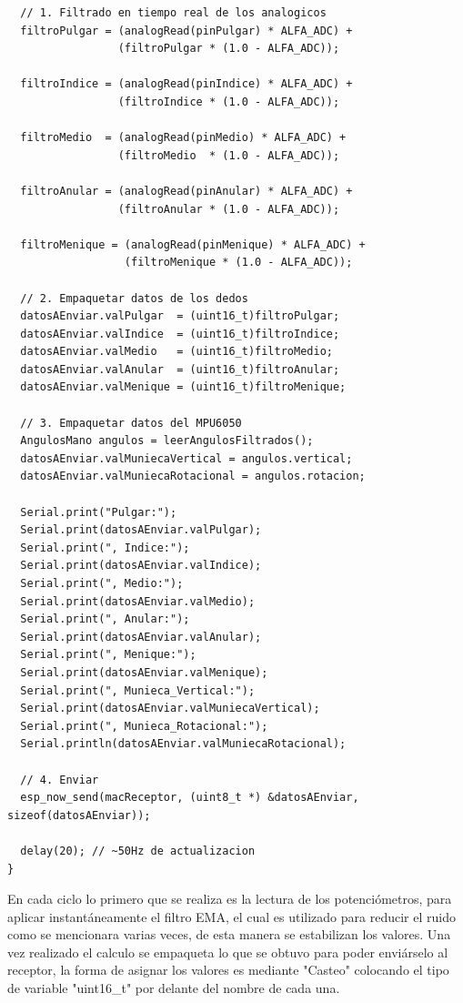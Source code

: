 \documentclass[10pt]{article}
\begin{document}
\begin{lstlisting}
  // 1. Filtrado en tiempo real de los analogicos
  filtroPulgar = (analogRead(pinPulgar) * ALFA_ADC) + 
                 (filtroPulgar * (1.0 - ALFA_ADC));
  
  filtroIndice = (analogRead(pinIndice) * ALFA_ADC) + 
                 (filtroIndice * (1.0 - ALFA_ADC));
  
  filtroMedio  = (analogRead(pinMedio) * ALFA_ADC) + 
                 (filtroMedio  * (1.0 - ALFA_ADC));
  
  filtroAnular = (analogRead(pinAnular) * ALFA_ADC) + 
                 (filtroAnular * (1.0 - ALFA_ADC));
  
  filtroMenique = (analogRead(pinMenique) * ALFA_ADC) + 
                  (filtroMenique * (1.0 - ALFA_ADC));

  // 2. Empaquetar datos de los dedos
  datosAEnviar.valPulgar  = (uint16_t)filtroPulgar;
  datosAEnviar.valIndice  = (uint16_t)filtroIndice;
  datosAEnviar.valMedio   = (uint16_t)filtroMedio;
  datosAEnviar.valAnular  = (uint16_t)filtroAnular;
  datosAEnviar.valMenique = (uint16_t)filtroMenique;

  // 3. Empaquetar datos del MPU6050
  AngulosMano angulos = leerAngulosFiltrados();
  datosAEnviar.valMuniecaVertical = angulos.vertical;
  datosAEnviar.valMuniecaRotacional = angulos.rotacion;

  Serial.print("Pulgar:");
  Serial.print(datosAEnviar.valPulgar);
  Serial.print(", Indice:");
  Serial.print(datosAEnviar.valIndice);
  Serial.print(", Medio:");
  Serial.print(datosAEnviar.valMedio);
  Serial.print(", Anular:");
  Serial.print(datosAEnviar.valAnular);
  Serial.print(", Menique:");     
  Serial.print(datosAEnviar.valMenique);
  Serial.print(", Munieca_Vertical:");    
  Serial.print(datosAEnviar.valMuniecaVertical);
  Serial.print(", Munieca_Rotacional:");  
  Serial.println(datosAEnviar.valMuniecaRotacional);

  // 4. Enviar
  esp_now_send(macReceptor, (uint8_t *) &datosAEnviar, sizeof(datosAEnviar));
  
  delay(20); // ~50Hz de actualizacion
}
\end{lstlisting}

En cada ciclo lo primero que se realiza es la lectura de los potenciómetros, para aplicar instantáneamente el filtro EMA, el cual es utilizado para reducir el ruido como se mencionara varias veces, de esta manera se estabilizan los valores. Una vez realizado el calculo se empaqueta lo que se obtuvo para poder enviárselo al receptor, la forma de asignar los valores es mediante "Casteo" colocando el tipo de variable "uint16\_t" por delante del nombre de cada una. 
\end{document}
